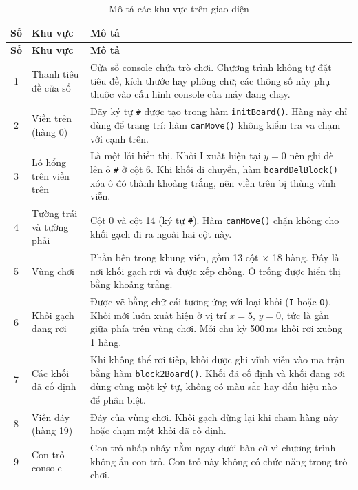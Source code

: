 \begin{longtable}{|c|p{3.6cm}|p{11.2cm}|}
    \caption{Mô tả các khu vực trên giao diện}
    \label{tab:ui_khu_vuc} \\
    \hline
    \textbf{Số} & \textbf{Khu vực} & \textbf{Mô tả} \\
    \hline
    \endfirsthead
    \hline
    \textbf{Số} & \textbf{Khu vực} & \textbf{Mô tả} \\
    \hline
    \endhead
    1 & Thanh tiêu đề cửa sổ & Cửa sổ console chứa trò chơi. Chương trình không tự đặt tiêu đề, kích thước hay phông chữ; các thông số này phụ thuộc vào cấu hình console của máy đang chạy. \\
    \hline
    2 & Viền trên (hàng 0) & Dãy ký tự \texttt{\#} được tạo trong hàm \texttt{initBoard()}. Hàng này chỉ dùng để trang trí: hàm \texttt{canMove()} không kiểm tra va chạm với cạnh trên. \\
    \hline
    3 & Lỗ hổng trên viền trên & Là một lỗi hiển thị. Khối I xuất hiện tại $y = 0$ nên ghi đè lên ô \texttt{\#} ở cột 6. Khi khối di chuyển, hàm \texttt{boardDelBlock()} xóa ô đó thành khoảng trắng, nên viền trên bị thủng vĩnh viễn. \\
    \hline
    4 & Tường trái và tường phải & Cột 0 và cột 14 (ký tự \texttt{\#}). Hàm \texttt{canMove()} chặn không cho khối gạch đi ra ngoài hai cột này. \\
    \hline
    5 & Vùng chơi & Phần bên trong khung viền, gồm 13 cột $\times$ 18 hàng. Đây là nơi khối gạch rơi và được xếp chồng. Ô trống được hiển thị bằng khoảng trắng. \\
    \hline
    6 & Khối gạch đang rơi & Được vẽ bằng chữ cái tương ứng với loại khối (\texttt{I} hoặc \texttt{O}). Khối mới luôn xuất hiện ở vị trí $x = 5$, $y = 0$, tức là gần giữa phía trên vùng chơi. Mỗi chu kỳ 500\,ms khối rơi xuống 1 hàng. \\
    \hline
    7 & Các khối đã cố định & Khi không thể rơi tiếp, khối được ghi vĩnh viễn vào ma trận bằng hàm \texttt{block2Board()}. Khối đã cố định và khối đang rơi dùng cùng một ký tự, không có màu sắc hay dấu hiệu nào để phân biệt. \\
    \hline
    8 & Viền đáy (hàng 19) & Đáy của vùng chơi. Khối gạch dừng lại khi chạm hàng này hoặc chạm một khối đã cố định. \\
    \hline
    9 & Con trỏ console & Con trỏ nhấp nháy nằm ngay dưới bàn cờ vì chương trình không ẩn con trỏ. Con trỏ này không có chức năng trong trò chơi. \\
    \hline
\end{longtable}

